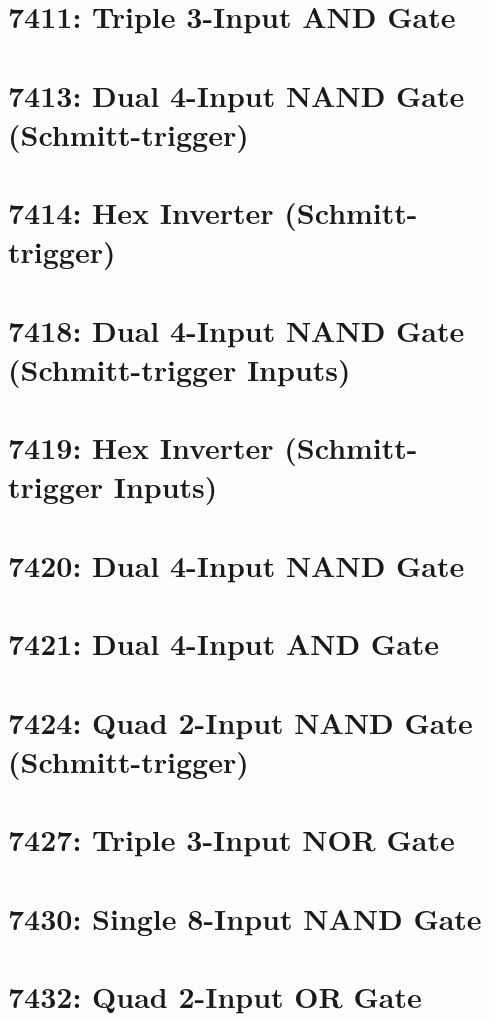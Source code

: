 \section{7411: Triple 3-Input AND Gate}

\section{7413: Dual 4-Input NAND Gate (Schmitt-trigger)}

\section{7414: Hex Inverter (Schmitt-trigger)}

\section{7418: Dual 4-Input NAND Gate (Schmitt-trigger Inputs)}

\section{7419: Hex Inverter (Schmitt-trigger Inputs)}

\section{7420: Dual 4-Input NAND Gate}

\section{7421: Dual 4-Input AND Gate}

\section{7424: Quad 2-Input NAND Gate (Schmitt-trigger)}

\section{7427: Triple 3-Input NOR Gate}

\section{7430: Single 8-Input NAND Gate}

\section{7432: Quad 2-Input OR Gate}

